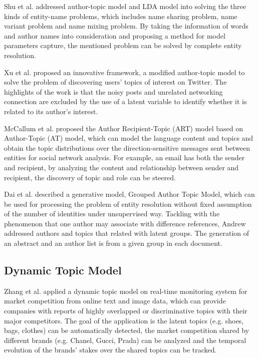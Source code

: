 Shu et al. \cite{shu2009latent} addressed author-topic model and LDA model into solving the three kinds of entity-name problems, which includes name sharing problem, name variant problem and name mixing problem. By taking the information of words and author names into consideration and proposing a method for model parameters capture, the mentioned problem can be solved by complete entity resolution.

Xu et al. \cite{xu2011discovering} proposed an innovative framework, a modified author-topic model to solve the problem of discovering users’ topics of interest on Twitter. The highlights of the work is that the noisy posts and unrelated networking connection are excluded by the use of a latent variable to identify whether it is related to its author’s interest.

McCallum et al. \cite{mccallum2005topic} proposed the Author Recipient-Topic (ART) model based on Author-Topic (AT) model, which can model the language content and topics and obtain the topic distributions over the direction-sensitive messages sent between entities for social network analysis. For example, an email has both the sender and recipient, by analyzing the content and relationship between sender and recipient, the discovery of topic and role can be steered.

Dai et al. \cite{dai2011grouped} described a generative model, Grouped Author Topic Model, which can be used for processing the problem of entity resolution without fixed assumption of the number of identities under unsupervised way. Tackling with the phenomenon that one author may associate with difference references, Andrew addressed authors and topics that related with latent groups. The generation of an abstract and an author list is from a given group in each document.

\subsection{Dynamic Topic Model}
\label{subsec:dtmApplication}

Zhang et al. \cite{zhang2015dynamic} applied a dynamic topic model on real-time monitoring system for market competition from online text and image data, which can provide companies with reports of highly overlapped or discriminative topics with their major competitors. The goal of the application is the latent topics (e.g. shoes, bags, clothes) can be automatically detected, the market competition shared by different brands (e.g. Chanel, Gucci, Prada) can be analyzed and the temporal evolution of the brands' stakes over the shared topics can be tracked.

